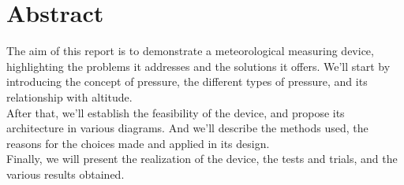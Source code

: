 \vspace{-2cm} 

\chapter*{Abstract}

The aim of this report is to demonstrate a meteorological measuring device, highlighting the problems it addresses and the solutions it offers. We'll start by introducing the concept of pressure, the different types of pressure, and its relationship with altitude.\\

After that, we'll establish the feasibility of the device, and propose its architecture in various diagrams. And we'll describe the methods used, the reasons for the choices made and applied in its design.\\

Finally, we will present the realization of the device, the tests and trials, and the various results obtained.  

